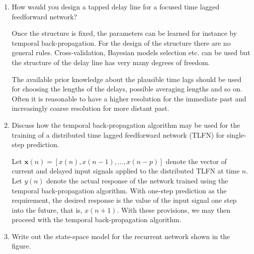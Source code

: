 \begin{enumerate}
\begin{solution}
  \end{solution}
  
\item How would you design a tapped delay line for a focused time
  lagged feedforward network?


  \begin{solution}

    Once the structure is fixed, the parameters can be learned for
    instance by temporal back-propagation.  For the design of the structure there are no
    general rules.  Cross-validation, Bayesian models selection etc.
    can be used but the structure of the delay line has very many
    degrees of freedom.

    The available prior knowledge about the plausible time lags should
    be used for choosing the lengths of the delays, possible averaging
    lengths and so on.  Often it is reasonable to have a higher
    resolution for the immediate past and increasingly coarse
    resolution for more distant past.


  \end{solution}
  
\item Discuss how the temporal back-propagation algorithm may be used for the
  training of a distributed time lagged feedforward network (TLFN) for single-step prediction.

  \begin{solution}

    Let $\mathbf{x}(n)=[x(n), x(n-1), \ldots ,x(n-p)]$ denote the vector of current and
    delayed input signals applied to
    the distributed TLFN at time $n$. Let $y(n)$ denote the actual
    response of the network trained using the temporal back-propagation
    algorithm. With one-step prediction as the requirement, the desired
    response is the value of the input signal one step into the future,
    that is, $x(n+1)$. With these provisions, we may then
    proceed with the temporal back-propagation algorithm.

  \end{solution}
  


\item Write out the state-space model for the recurrent network shown in the
  figure.


\end{enumerate}
